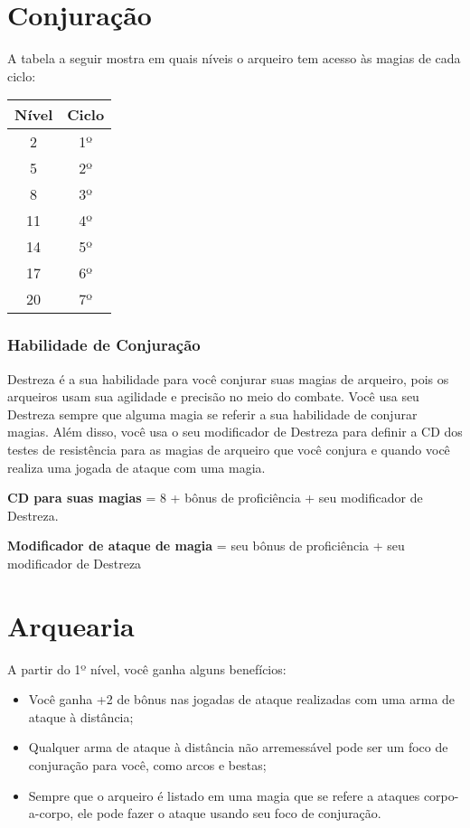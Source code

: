\documentclass{RPG_Adventure}[2021/10/20]
\begin{document}
\begin{multicols}{2}
\section*{Conjuração}%

A tabela a seguir mostra em quais níveis o arqueiro tem acesso às magias de cada
ciclo:

\begin{center}
\begin{tabular}{|||c||c|||}
    \hline
    \textbf{Nível} & \textbf{Ciclo} \\
    \hline
    2 & 1º \\
    \hline
    5 & 2º \\
    \hline
    8 & 3º \\
    \hline
    11 & 4º \\
    \hline
    14 & 5º \\
    \hline
    17 & 6º \\
    \hline
    20 & 7º \\
    \hline
\end{tabular}
\end{center}

\subsubsection*{Habilidade de Conjuração}%

Destreza é a sua habilidade para você conjurar suas magias de arqueiro, pois os
arqueiros usam sua agilidade e precisão no meio do combate.  Você usa seu
Destreza sempre que alguma magia se referir a sua habilidade de conjurar magias.
Além disso, você usa o seu modificador de Destreza para definir a CD dos testes
de resistência para as magias de arqueiro que você conjura e quando você realiza
uma jogada de ataque com uma magia.

\begin{center}
\textbf{CD para suas magias} = 8 + bônus de proficiência + seu modificador de
Destreza. \nl

\textbf{Modificador de ataque de magia} = seu bônus de proficiência + seu
modificador de Destreza
\end{center}

\section*{Arquearia}%

A partir do 1º nível, você ganha alguns benefícios:
\begin{itemize}
    \item Você ganha +2 de bônus nas jogadas de ataque realizadas com uma arma de ataque à distância;
    \item Qualquer arma de ataque à distância não arremessável pode ser um foco
        de conjuração para você, como arcos e bestas;
    \item Sempre que o arqueiro é listado em uma magia que se refere a ataques
        corpo-a-corpo, ele pode fazer o ataque usando seu foco de conjuração.
\end{itemize}


\end{multicols}
\end{document}
